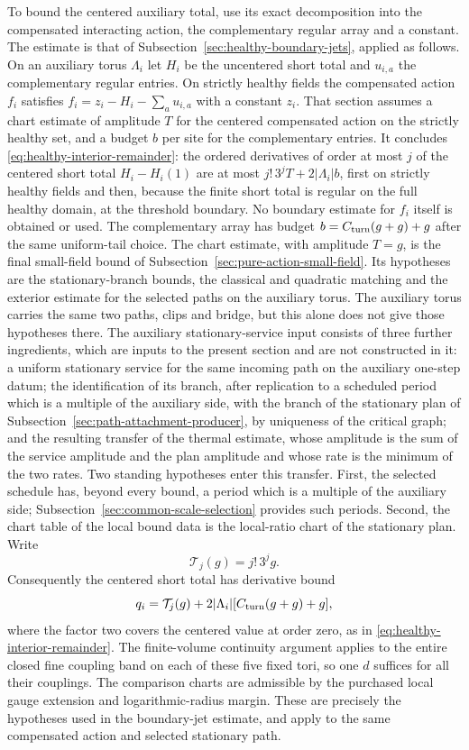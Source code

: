 To bound the centered auxiliary total, use its exact decomposition
into the compensated interacting action, the complementary regular
array and a constant. The estimate is that of
Subsection~\ref{sec:healthy-boundary-jets}, applied as follows. On an
auxiliary torus $\Lambda_i$ let $H_i$ be the uncentered short total
and $u_{i,a}$ the complementary regular entries. On strictly healthy
fields the compensated action $f_i$ satisfies
$f_i=z_i-H_i-\sum_au_{i,a}$ with a constant $z_i$. That section
assumes a chart estimate of amplitude $T$ for the centered
compensated action on the strictly healthy set, and a budget $b$ per
site for the complementary entries. It concludes
\eqref{eq:healthy-interior-remainder}: the ordered derivatives of
order at most $j$ of the centered short total $H_i-H_i(1)$ are at
most $j!\,3^jT+2|\Lambda_i|b$, first on strictly healthy fields and
then, because the finite short total is regular on the full healthy
domain, at the threshold boundary. No boundary estimate for $f_i$
itself is obtained or used. The complementary array has budget
$b=C_{\rm turn}(g+g)+g$ after the same uniform-tail choice. The
chart estimate, with amplitude $T=g$, is the final
small-field bound of Subsection~\ref{sec:pure-action-small-field}. Its
hypotheses are the stationary-branch bounds, the classical and
quadratic matching and the exterior estimate for the selected
paths on the auxiliary torus. The auxiliary torus carries the same
two paths, clips and bridge, but this alone does not give those
hypotheses there. The auxiliary stationary-service input consists of three further
ingredients, which are inputs to the present section and are not
constructed in it: a uniform stationary service for the same
incoming path on the auxiliary one-step datum; the identification
of its branch, after replication to a scheduled period which is a
multiple of the auxiliary side, with the branch of the stationary
plan of Subsection~\ref{sec:path-attachment-producer}, by uniqueness of
the critical graph; and the resulting transfer of the thermal
estimate, whose amplitude is the sum of the service amplitude and
the plan amplitude and whose rate is the minimum of the two rates.
Two standing hypotheses enter this transfer. First, the selected
schedule has, beyond every bound, a period which is a multiple of
the auxiliary side; Subsection~\ref{sec:common-scale-selection}
provides such periods. Second, the chart table of the local bound
data is the local-ratio chart of the stationary plan.
Write
\[
                       \mathcal T_j(g)=j!\,3^jg .
\]
Consequently the
centered short total has derivative bound
\[
 q_i=\mathcal T_j(g)
             +2|\Lambda_i|[C_{\rm turn}(g+g)+g],
\]
where the factor two covers the centered value at order zero, as in
\eqref{eq:healthy-interior-remainder}. The finite-volume continuity
argument applies to the entire closed fine coupling band on each of
these five fixed tori, so one $d$ suffices for all their couplings.
The comparison charts are admissible by the purchased local gauge
extension and logarithmic-radius margin. These are precisely the
hypotheses used in the boundary-jet estimate, and apply to the same
compensated action and selected stationary path.

